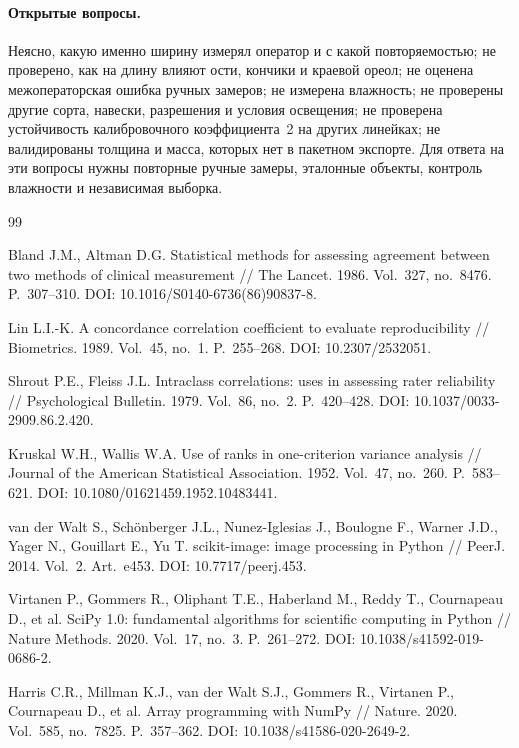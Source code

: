 \documentclass[12pt,a4paper]{article}
\begin{document}
\paragraph{Открытые вопросы.}
Неясно, какую именно ширину измерял оператор и с какой повторяемостью;
не проверено, как на длину влияют ости, кончики и краевой ореол; не
оценена межоператорская ошибка ручных замеров; не измерена влажность;
не проверены другие сорта, навески, разрешения и условия освещения; не
проверена устойчивость калибровочного коэффициента~2 на других
линейках; не валидированы толщина и масса, которых нет в пакетном
экспорте. Для ответа на эти вопросы нужны повторные ручные замеры,
эталонные объекты, контроль влажности и независимая выборка.

\begin{thebibliography}{99}

Bland J.M., Altman D.G. Statistical methods for assessing agreement between
two methods of clinical measurement // The Lancet. 1986. Vol.~327, no.~8476.
P.~307--310. DOI: 10.1016/S0140-6736(86)90837-8.

Lin L.I.-K. A concordance correlation coefficient to evaluate
reproducibility // Biometrics. 1989. Vol.~45, no.~1. P.~255--268.
DOI: 10.2307/2532051.

Shrout P.E., Fleiss J.L. Intraclass correlations: uses in assessing rater
reliability // Psychological Bulletin. 1979. Vol.~86, no.~2.
P.~420--428. DOI: 10.1037/0033-2909.86.2.420.

Kruskal W.H., Wallis W.A. Use of ranks in one-criterion variance analysis //
Journal of the American Statistical Association. 1952. Vol.~47, no.~260.
P.~583--621. DOI: 10.1080/01621459.1952.10483441.

van der Walt S., Sch\"onberger J.L., Nunez-Iglesias J., Boulogne F.,
Warner J.D., Yager N., Gouillart E., Yu T. scikit-image: image processing
in Python // PeerJ. 2014. Vol.~2. Art.~e453. DOI: 10.7717/peerj.453.

Virtanen P., Gommers R., Oliphant T.E., Haberland M., Reddy T.,
Cournapeau D., et al. SciPy 1.0: fundamental algorithms for scientific
computing in Python // Nature Methods. 2020. Vol.~17, no.~3.
P.~261--272. DOI: 10.1038/s41592-019-0686-2.

Harris C.R., Millman K.J., van der Walt S.J., Gommers R., Virtanen P.,
Cournapeau D., et al. Array programming with NumPy // Nature. 2020.
Vol.~585, no.~7825. P.~357--362. DOI: 10.1038/s41586-020-2649-2.


\end{thebibliography}
\end{document}
